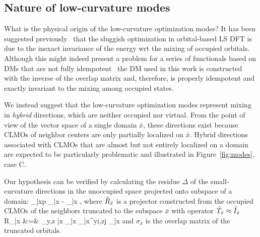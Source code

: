 \documentclass[aps,prl,twocolumn,reprint,amsmath,amssymb]{revtex4-1}
\begin{document}
\subsection{Nature of low-curvature modes} \label{marker:nature} 

What is the physical origin of the low-curvature optimization modes? 
It has been suggested previously~\cite{goedecker1999linear} that the sluggish optimization in orbital-based LS DFT is due to the inexact invariance of the energy wrt the mixing of occupied orbitals. 
Although this might indeed present a problem for a series of functionals based on DMs that are not fully idempotent~\cite{Galli-90s,grumbach} the DM used in this work is constructed with the inverse of the overlap matrix and, therefore, is properly idempotent and exactly invariant to the mixing among occupied states. 

We instead suggest that the low-curvature optimization modes represent mixing in \emph{hybrid} directions, which are neither occupied nor virtual. From the point of view of the vector space of a single domain $\bar{x}$, these directions exist because CLMOs of neighbor centers are only partially localized on $\bar{x}$. 
Hybrid directions associated with CLMOs that are almost but not entirely localized on a domain are expected to be particularly problematic and illustrated in Figure~\ref{fig:modes}, case C. 

Our hypothesis can be verified by calculating the residue $\Delta$ of the small-curvature directions  in the unoccupied space projected onto subspace of a domain:
%
\bea
\label{eq:residue}
\Delta_{\bar{x}p} \equiv {} _{\bar{x}} - _{\bar{x}} , 
\eea
%
where $\hat{R}_{\bar{x}}$ is a projector constructed from the occupied CLMOs of the neighbors truncated to the subspace $\bar{x}$ with operator $\hat{T}_{\bar{x}} \approx \hat{I}_{\bar{x}}$
\bea
{R}_{\bar{x}} &=& \sum_{y,z \in \bar{x}} _{\bar{x}}  \sigma_{\bar{x}}^{yi,zj}  _{\bar{x}}
\label{eq:C}
\eea
%
and $\sigma_{\bar{x}}$ is the overlap matrix of the truncated orbitals.
\end{document}
